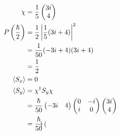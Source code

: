\documentclass{article}
\begin{document}
\begin{enumerate}
        \begin{align*}
          \chi                             & = \frac{1}{5} \begin{pmatrix}
                                                             3 i \\
                                                             4
                                                           \end{pmatrix}                                  \\
          P \left( \frac{\hbar}{2} \right) & = \frac{1}{2} \left| \frac{1}{5} (3 i + 4) \right|^2          \\
                                           & = \frac{1}{50} (-3 i + 4) (3 i + 4)                           \\
                                           & = \frac{1}{2}                                                 \\
          \braket{S_x}                     & = 0                                                           \\
          \braket{S_y}                     & = \chi^\dagger S_y \chi                                       \\
                                           & = \frac{\hbar}{50} \begin{pmatrix}
                                                                  -3 i & 4
                                                                \end{pmatrix} \begin{pmatrix}
                                                                                0 & -i \\
                                                                                i & 0
                                                                              \end{pmatrix} \begin{pmatrix}
                                                                                              3 i \\
                                                                                              4
                                                                                            \end{pmatrix} \\
                                           & = \frac{\hbar}{50} \begin{pmatrix}

\end{pmatrix}
\end{align*}
\end{enumerate}
\end{document}
